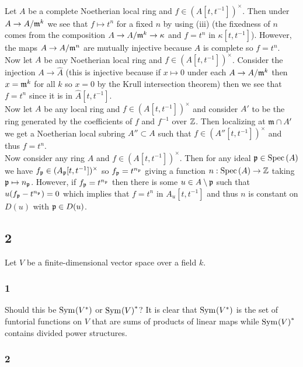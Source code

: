 \documentclass[12pt]{article}
\begin{document}
Let $A$ be a complete Noetherian local ring and $f \in (A[t, t^{-1}])^\times$. Then under $A \to A / \mathfrak{m}^k$ we see that $f \mapsto t^{n}$ for a fixed $n$ by using (iii) (the fixedness of $n$ comes from the composition $A \to A / \mathfrak{m}^k \to \kappa$ and $f = t^n$ in $\kappa[t,t^{-1}]$). However, the maps $A \to A / \mathfrak{m}^n$ are mutually injective because $A$ is complete so $f = t^n$.
\bigskip\\
Now let $A$ be any Noetherian local ring and $f \in (A[t, t^{-1}])^\times$. Consider the injection $A \to \hat{A}$ (this is injective because if $x \mapsto 0$ under each $A \to A / \mathfrak{m}^k$ then $x = \mathfrak{m}^k$ for all $k$ so $x = 0$ by the Krull intersection theorem) then we see that $f = t^n$ since it is in $\hat{A}[t,t^{-1}]$.
\bigskip\\
Now let $A$ be any local ring and $f \in (A[t,t^{-1}])^\times$ and consider $A'$ to be the ring generated by the coefficients of $f$ and $f^{-1}$ over $\mathbb{Z}$. Then localizing at $\mathfrak{m} \cap A'$ we get a Noetherian local subring $A'' \subset A$ such that $f \in (A''[t,t^{-1}])^\times$ and thus $f = t^n$.
\bigskip\\
Now consider any ring $A$ and $f \in (A[t,t^{-1}])^\times$. Then for any ideal $\mathfrak{p} \in \mathrm{Spec}\left( A \right)$ we have $f_{\mathfrak{p}} \in (A_{\mathfrak{p}}[t, t^{-1}])^\times$ so $f_{\mathfrak{p}} = t^{n_{\mathfrak{p}}}$ giving a function $n : \mathrm{Spec}\left( A \right) \to \mathbb{Z}$ taking $\mathfrak{p} \mapsto n_{\mathfrak{p}}$. However, if $f_{\mathfrak{p}} = t^{n_{\mathfrak{p}}}$ then there is some $u \in A \setminus \mathfrak{p}$ such that $u(f_{\mathfrak{p}} - t^{n_{\mathfrak{p}}}) = 0$ which implies that $f = t^n$ in $A_u[t, t^{-1}]$ and thus $n$ is constant on $D(u)$ with $\mathfrak{p} \in D(u)$. 

\subsection{2}

Let $V$ be a finite-dimensional vector space over a field $k$. 

\subsubsection{1}

Should this be $\mathrm{Sym}_{}\! \left( V^* \right)$ or $\mathrm{Sym}_{}\! \left( V \right)^*$? It is clear that $\mathrm{Sym}_{}\! \left( V^* \right)$ is the set of funtorial functions on $V$ that are sums of products of linear maps while $\mathrm{Sym}_{}\! \left( V \right)^*$ contains divided power structures.

\subsubsection{2}
\end{document}
